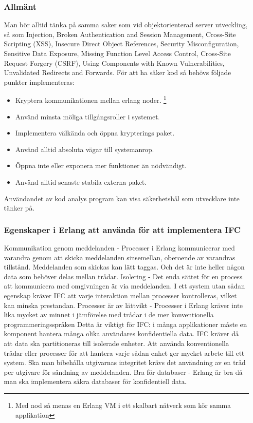 \documentclass[12pt]{article}
\begin{document}
\subsubsection*{Allmänt}
	Man bör alltid tänka på samma saker som vid objektorienterad server utveckling, så som Injection, Broken Authentication and Session Management, Cross-Site Scripting (XSS), Insecure Direct Object References, Security Misconfiguration, Sensitive Data Exposure, Missing Function Level Access Control, Cross-Site Request Forgery (CSRF), Using Components with Known Vulnerabilities, Unvalidated Redirects and Forwards.
\cite{owasp}
	För att ha säker kod så behövs följade punkter implementeras:
	\begin{itemize} 
		\item Kryptera kommunikationen mellan erlang noder. \footnote{Med nod så menas en Erlang VM i ett skalbart nätverk som kör samma applikation}
		\item Använd minsta möliga tillgångsroller i systemet.
		\item Implementera välkända och öppna krypterings paket.
		\item Använd alltid absoluta vägar till systemanrop.
		\item Öppna inte eller exponera mer funktioner än nödvändigt.
		\item Använd alltid senaste stabila externa paket.
	\end{itemize}
Användandet av kod analys program kan visa säkerhetshål som utvecklare inte tänker på.

\subsubsection*{Egenskaper i Erlang att använda för att implementera IFC} 
Kommunikation genom meddelanden - Processer i Erlang kommunicerar med varandra genom att skicka meddelanden sinsemellan, oberoende av varandras tillstånd.
 Meddelanden som skickas kan lätt taggas.
 Och det är inte heller någon data som behöver delas mellan trådar.
Isolering - Det enda sättet för en process att kommunicera med omgivningen är via meddelanden.
 I ett system utan sådan egenskap kräver IFC att varje interaktion mellan processer kontrolleras, vilket kan minska prestandan.
 Processer är av lättvikt - Processer i Erlang kräver inte lika mycket av minnet i jämförelse med trådar i de mer konventionella programmeringsspråken Detta är viktigt för IFC: i många applikationer måste en komponent hantera många olika användares konfidentiella data.
 IFC kräver då att data ska partitioneras till isolerade enheter.
 Att använda konventionella trådar eller processer för att hantera varje sådan enhet ger mycket arbete till ett system.
 Ska man bibehålla utgivarnas integritet krävs det användning av en tråd per utgivare för sändning av meddelanden.
 \cite{IFC}
Bra för databaser - Erlang är bra då man ska implementera säkra databaser för konfidentiell data.
 \cite{database}
\end{document}
